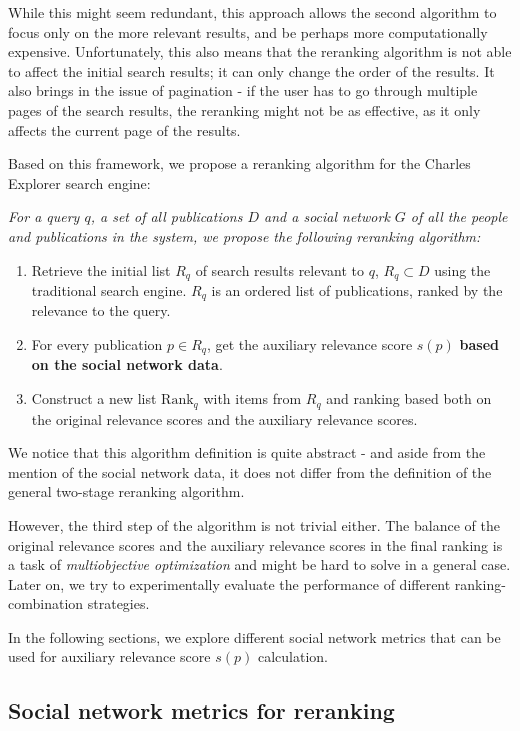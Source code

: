 While this might seem redundant, this approach allows the second algorithm to focus only on the more relevant results, 
and be perhaps more computationally expensive.
Unfortunately, this also means that the reranking algorithm is not able to affect the initial search results; 
it can only change the order of the results. It also brings in the issue of pagination - if the user has to go 
through multiple pages of the search results, the reranking might not be as effective, as it only affects the current page of the results.

Based on this framework, we propose a reranking algorithm for the Charles Explorer search engine:

\textit{For a query $q$, a set of all publications $D$ and a social network $G$ of all the people and publications in the system, 
we propose the following reranking algorithm:}

\begin{enumerate}
    \item Retrieve the initial list $R_q$ of search results relevant to $q$, $R_q \subset D$ using the traditional search engine.
    $R_q$ is an ordered list of publications, ranked by the relevance to the query.
    \item For every publication $p \in R_q$, get the auxiliary relevance score $s(p)$ \textbf{based on the social network data}.
    \item Construct a new list $\text{Rank}_q$ with items from $R_q$ and ranking based both on the original relevance scores and the auxiliary relevance scores.
\end{enumerate}

We notice that this algorithm definition is quite abstract - and aside from the mention of the social network data, it does not differ from the definition of the general two-stage reranking algorithm.

However, the third step of the algorithm is not trivial either. The balance of the original relevance scores and the auxiliary relevance scores
in the final ranking is a task of \textit{multiobjective optimization} and might be hard to solve in a general case.
Later on, we try to experimentally evaluate the performance of different ranking-combination strategies.

In the following sections, we explore different social network metrics that can be used for auxiliary relevance score $s(p)$ calculation.

\subsection{Social network metrics for reranking}\label{social-network-metrics}

